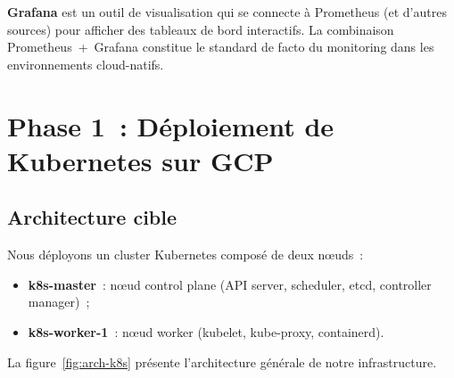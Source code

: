 \documentclass[12pt,a4paper,french]{report}
\newcommand{\kw}[1]{\textbf{#1}}
\begin{document}
\kw{Grafana} est un outil de visualisation qui se connecte à Prometheus (et d'autres sources) pour afficher des tableaux de bord interactifs. La combinaison Prometheus~+~Grafana constitue le standard de facto du monitoring dans les environnements cloud-natifs.

\chapter{Phase 1~: Déploiement de Kubernetes sur GCP}
\label{chap:phase1}

\section{Architecture cible}

Nous déployons un cluster Kubernetes composé de deux nœuds~:
\begin{itemize}
  \item \textbf{k8s-master}~: nœud control plane (API server, scheduler, etcd, controller manager)~;
  \item \textbf{k8s-worker-1}~: nœud worker (kubelet, kube-proxy, containerd).
\end{itemize}

La figure~\ref{fig:arch-k8s} présente l'architecture générale de notre infrastructure.
\end{document}
